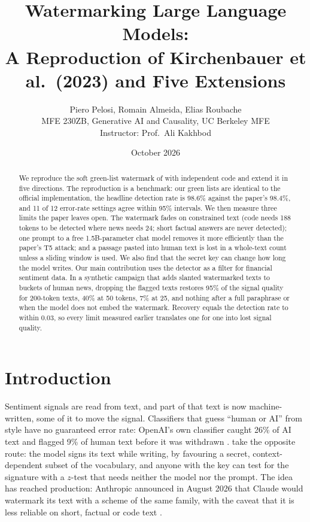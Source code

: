 \documentclass[12pt,letterpaper]{article}
\title{\large\textbf{Watermarking Large Language Models:\\ A Reproduction of Kirchenbauer et al.\ (2023) and Five Extensions}}
\author{\normalsize Piero Pelosi, Romain Almeida, Elias Roubache\\[0.3em]
\small MFE 230ZB, Generative AI and Causality, UC Berkeley MFE\\
\small Instructor: Prof.\ Ali Kakhbod}
\date{\normalsize October 2026}
\begin{document}
\maketitle
\vspace{-2em}

\begin{abstract}
\singlespacing\noindent
We reproduce the soft green-list watermark of \citet{kirchenbauer2023watermark} with independent code and extend it in five directions. The reproduction is a benchmark: our green lists are identical to the official implementation, the headline detection rate is 98.6\% against the paper's 98.4\%, and 11 of 12 error-rate settings agree within 95\% intervals. We then measure three limits the paper leaves open. The watermark fades on constrained text (code needs 188 tokens to be detected where news needs 24; short factual answers are never detected); one prompt to a free 1.5B-parameter chat model removes it more efficiently than the paper's T5 attack; and a passage pasted into human text is lost in a whole-text count unless a sliding window is used. We also find that the secret key can change how long the model writes. Our main contribution uses the detector as a filter for financial sentiment data. In a synthetic campaign that adds slanted watermarked texts to buckets of human news, dropping the flagged texts restores 95\% of the signal quality for 200-token texts, 40\% at 50 tokens, 7\% at 25, and nothing after a full paraphrase or when the model does not embed the watermark. Recovery equals the detection rate to within 0.03, so every limit measured earlier translates one for one into lost signal quality.
\end{abstract}

\section{Introduction}

Sentiment signals are read from text, and part of that text is now machine-written, some of it to move the signal. Classifiers that guess ``human or AI'' from style have no guaranteed error rate: OpenAI's own classifier caught 26\% of AI text and flagged 9\% of human text before it was withdrawn \citep{openai2023classifier}. \citet{kirchenbauer2023watermark} take the opposite route: the model signs its text while writing, by favouring a secret, context-dependent subset of the vocabulary, and anyone with the key can test for the signature with a $z$-test that needs neither the model nor the prompt. The idea has reached production: Anthropic announced in August 2026 that Claude would watermark its text with a scheme of the same family, with the caveat that it is less reliable on short, factual or code text \citep{anthropic2026watermark}.
\end{document}
